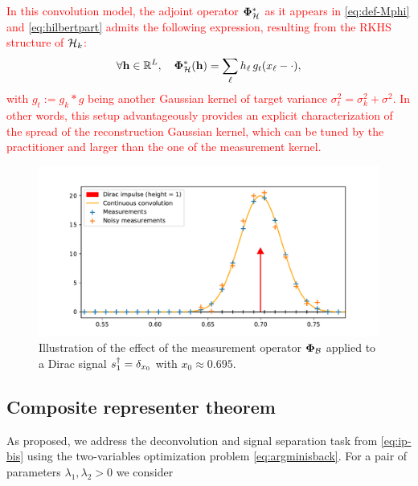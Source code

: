 \documentclass[12pt]{article}
\begin{document}
            \textcolor{red}{
            \begin{remark}
            In this convolution model, the adjoint operator $\bm{\Phi}_\mathcal{H}^*$ as it appears in \eqref{eq:def-Mphi} and \eqref{eq:hilbertpart} admits the following expression, resulting from the RKHS structure of $\mathcal{H}_k$:
            \begin{equation}
                \label{eq:rkhs-atom}
                \forall \mathbf{h} \in \mathbb{R}^L, \quad \bm{\Phi}_\mathcal{H}^* (\mathbf{h}) = \sum_{\ell} h_\ell\, g_t(x_\ell - \cdot),
            \end{equation}
            with $g_t := g_k * g$ being another Gaussian kernel of target variance $\sigma_t^2 = \sigma_k^2 + \sigma^2$. In other words, this setup advantageously provides an explicit characterization of the spread of the reconstruction Gaussian kernel, which can be tuned by the practitioner and larger than the one of the measurement kernel.
            \end{remark}
            }


            \begin{figure}
                \centering
                \includegraphics[width=\linewidth]{figures/simple_reco/measurement_figure.pdf}        
                \caption{Illustration of the effect of the measurement operator $\bm{\Phi}_\mathcal{B}$ applied to a Dirac signal $s_1^\dagger = \delta_{x_0}$ with $x_0 \approx 0.695$.}
                \label{fig:simple:measop}
            \end{figure}

    
    \subsection{Composite representer theorem}

        As proposed, we address the deconvolution and signal separation task from \eqref{eq:ip-bis} using the two-variables optimization problem \eqref{eq:argminisback}. For a pair of parameters $\lambda_1, \lambda_2 > 0$ we consider
\end{document}
